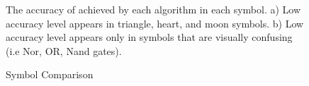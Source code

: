 \documentclass[preprint,10pt,5p,twocolumn]{elsarticle}
\begin{document}
\begin{figure} 
	\centering 
	\caption {Symbol Comparison} The accuracy of achieved by each algorithm in each symbol. a) Low accuracy level appears in triangle, heart, and moon symbols. b) Low accuracy level appears only in symbols that are visually confusing (i.e Nor, OR, Nand gates). 
\end{figure}  
\begin{table}
	\centering
 
	\caption{Confusion Matrix of Hs-DS}
	\label{tab:ConfusionMatrix}
\end{table}
%  
\end{document}
